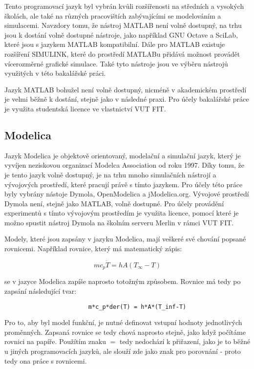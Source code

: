 Tento programovací jazyk byl vybrán kvůli rozšířenosti na středních a vysokých školách, ale také na různých pracovištích zabývajícími se modelováním a simulacemi. Navzdory tomu, že nástroj MATLAB není volně dostupný, na trhu jsou k dostání volně dostupné nástroje, jako například GNU Octave a SciLab, které jsou s jazykem MATLAB kompatibilní. Dále pro MATLAB existuje rozšíření SIMULINK, které do prostředí MATLABu přidává možnost provádět vícerozměrné grafické simulace. Také tyto nástroje jsou ve výběru nástrojů využitých v této bakalářské práci.

Jazyk MATLAB bohužel není volně dostupný, nicméně v akademickém prostředí je velmi běžně k dostání, stejně jako v následné praxi. Pro účely bakalářské práce je využita studentská licence ve vlastnictví VUT FIT.


\subsection{Modelica}
Jazyk Modelica je objektově orientovaný, modelační a simulační jazyk, který je vyvíjen neziskovou organizací Modelca Association od roku 1997. Díky tomu, že je tento jazyk volně dostupný, je na trhu mnoho simulačních nástrojí a vývojových prostředí, které pracují právě s tímto jazykem. Pro účely této práce byly vybrány nástoje Dymola, OpenModelica a jModelica.org. Vývojové prostředí Dymola není, stejně jako MATLAB, volně dostupné. Pro účely provádění experimentů s tímto vývojovým prostředím je využita licence, pomocí které je možno spustit nástroj Dymola na školním serveru Merlin v rámci VUT FIT.

Modely, které jsou zapsány v jazyku Modelica, mají veškeré své chování popsané rovnicemi. Například rovnice, který má matematický zápis:

$$
mc_p\Dot{T} = hA(T_{\infty} - T)
$$

se v jazyce Modelica zapíše naprosto totožným způsobem. Rovnice má tedy po zapsání následující tvar:

\begin{verbatim}
                        m*c_p*der(T) = h*A*(T_inf-T)
\end{verbatim}

Pro to, aby byl model funkční, je nutné definovat vstupní hodnoty jednotlivých proměnných. Zapsaná rovnice se tedy chová naprosto stejně, jako když počítáme rovnici na papíře. Použítím znaku $ = $ tedy nedochází k přiřazení, jako je to běžné u jiných programovacích jazyků, ale slouží zde jako znak pro porovnání - proto tedy ona práce s rovnicemi.

